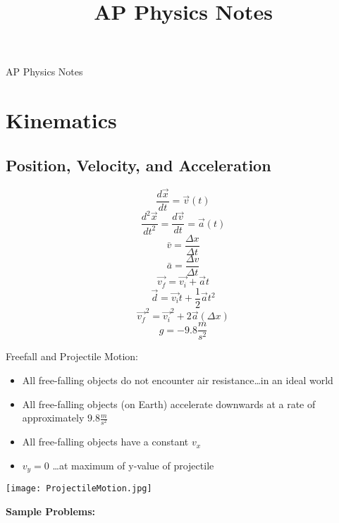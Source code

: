 \documentclass{article}
\title{AP Physics Notes}
\begin{document}
  
  \begingroup  
    \centering
    \LARGE AP Physics Notes\\[1ex]
  \endgroup
  
  \section{Kinematics}
    \subsection{Position, Velocity, and Acceleration}
    	\begin{multicols}{2}
    		\[
            	\frac{d\vec{x}}{dt}=\vec{v}(t)
            \]
    		\[
            	\frac{d^2\vec{x}}{dt^2}=\frac{d\vec{v}}{dt}=\vec{a}(t)
            \]
    		\[
            	\bar{v}=\frac{\Delta{x}}{\Delta{t}}
            \]
    		\[
            	\bar{a}=\frac{\Delta{v}}{\Delta{t}}
            \]
    		\[
            	\vec{v_f}=\vec{v_i}+\vec{a}t
            \]
    		\[
            	\vec{d}=\vec{v_i}t+\frac{1}{2}\vec{a}t^2
            \]
    		\[
            	\vec{v_f}^2=\vec{v_i}^2+2\vec{a}(\Delta{x})
            \]
    		\[
            	g=-9.8\frac{m}{s^2}
            \]
    
    		\columnbreak
    
    		Freefall and Projectile Motion:
    		\vspace{3mm}
    		\begin{itemize}
    			\item All free-falling objects do not encounter air resistance\ldots in an ideal world
    			\item All free-falling objects (on Earth) accelerate downwards at a rate of approximately $9.8\frac{m}{s^2}$
    			\item All free-falling objects have a constant $v_x$
    			\item $v_y=0$ \ldots at maximum of y-value of projectile
    		\end{itemize}
    
    		\vspace{2ex}
    		\texttt{[image: ProjectileMotion.jpg]}
    	\end{multicols}
    \textbf{Sample Problems:}
\end{document}
